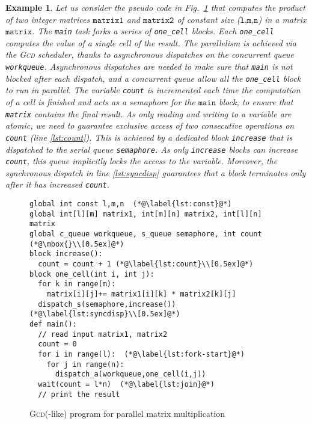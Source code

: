 \documentclass[runningheads,oribibl,]{article}
\renewcommand{\gcd}{\textsc{Gcd}\xspace}
\newtheorem{example}{Example}{}
\begin{document}
\begin{example}\label{ex:gcd-matrixmult}
  Let us consider the pseudo code in Fig.~\ref{fig:example-gcd} that
  computes the product of two integer matrices $\texttt{matrix1}$ and
  $\texttt{matrix2}$ of constant size ($\texttt{l,m,n}$)
  in a matrix $\texttt{matrix}$. The \texttt{main}
  task forks a series of \texttt{one\_cell} blocks. Each
  \texttt{one\_cell} computes the value of a single cell of the
  result. The parallelism is achieved via the \gcd scheduler, thanks
  to \emph{asynchronous dispatches} on the \emph{concurrent} queue
  \texttt{workqueue}. Asynchronous dispatches are needed to make sure
  that \texttt{main} is not blocked after each dispatch, and a
  concurrent queue allow all the \texttt{one\_cell} block to run in
  parallel.  The variable \texttt{count} is incremented each time the
  computation of a cell is finished and acts as a semaphore for the
  $\texttt{main}$ block, to ensure that \texttt{matrix} contains the
  final result. As only reading and writing to a variable are atomic,
  we need to guarantee exclusive access of two consecutive operations
  on \texttt{count} (line \ref{lst:count}). This is achieved by a
  dedicated block \texttt{increase} that is dispatched to the
  \emph{serial} queue \texttt{semaphore}. As only \texttt{increase}
  blocks can increase \texttt{count}, this queue implicitly locks the
  access to the variable.  Moreover, the synchronous dispatch in line
  \ref{lst:syncdisp}  guarantees that a block terminates only
  after it has increased \texttt{count}.
      \end{example}




\begin{figure}[t!]
  \centering
  \begin{lstlisting}
global int const l,m,n  (*@\label{lst:const}@*)
global int[l][m] matrix1, int[m][n] matrix2, int[l][n] matrix
global c_queue workqueue, s_queue semaphore, int count (*@\mbox{}\\[0.5ex]@*)
block increase():
  count = count + 1 (*@\label{lst:count}\\[0.5ex]@*)
block one_cell(int i, int j):
  for k in range(m):
    matrix[i][j]+= matrix1[i][k] * matrix2[k][j]
  dispatch_s(semaphore,increase()) (*@\label{lst:syncdisp}\\[0.5ex]@*)
def main():
  // read input matrix1, matrix2
  count = 0
  for i in range(l):  (*@\label{lst:fork-start}@*)
    for j in range(n):
      dispatch_a(workqueue,one_cell(i,j))
  wait(count = l*n)  (*@\label{lst:join}@*)
  // print the result
  \end{lstlisting}
  \caption{\gcd(-like) program for parallel matrix multiplication}
\label{fig:example-gcd}
\end{figure}
\end{document}
